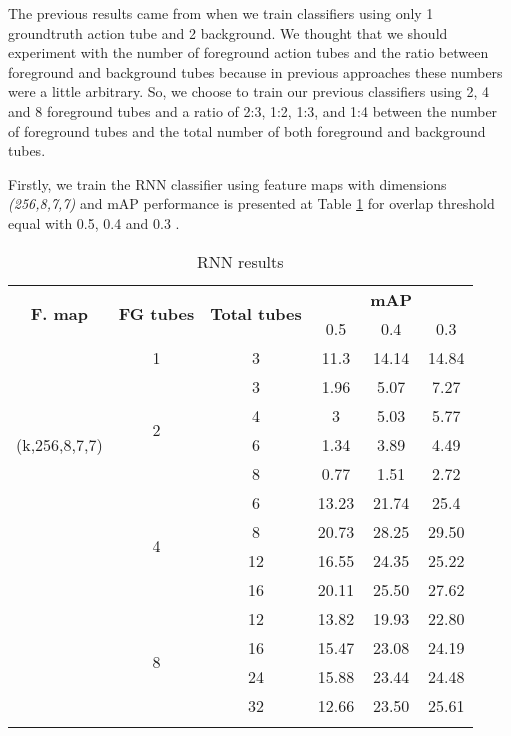 The previous results came from when we train classifiers using only 1 groundtruth action tube and 2 background. We thought that we should
experiment with the number of foreground action tubes and the ratio between foreground and background tubes because in previous approaches
these numbers were a little arbitrary. So, we choose to train our previous classifiers using 2, 4 and 8 foreground tubes and a ratio of 2:3,
1:2, 1:3, and 1:4 between the number of foreground tubes and the total number of both foreground and background tubes. \par

Firstly, we train the RNN classifier using feature maps with dimensions \textit{(256,8,7,7)} and mAP performance is presented at Table 
\ref{table:rnn_increased} for overlap threshold equal with 0.5, 0.4 and 0.3 . 

\begin{center}
  \begin{longtable}{|| c | c | c || c c c||}
    \hline
    \multirow{2}{*}{\textbf{F. map}} & \multirow{2}{*}{\textbf{FG tubes}}  & \multirow{2}{*}{\textbf{Total tubes}} & {} & \textbf{mAP} & {} \\
    {}  & {} & {} & 0.5 & 0.4 & 0.3 \\
    \hline
    \multirow{7}{*}{(k,256,8,7,7)} & 1 & 3 & 11.3 & 14.14 & 14.84 \\
    \cline{2-6}
    {} & \multirow{4}{*}{2} & 3 & 1.96 & 5.07 & 7.27 \\
    \cline{3-6}
    {} & {} & 4  & 3 & 5.03 & 5.77 \\
    \cline{3-6}
    {} & {} & 6 & 1.34 & 3.89 & 4.49 \\
    \cline{3-6}
    {} & {} & 8 & 0.77 & 1.51 & 2.72 \\
    \cline{2-6}
    {} & \multirow{4}{*}{4} &  6 & 13.23 & 21.74 & 25.4 \\
    \cline{3-6}
    {} & {} & 8 & 20.73 & 28.25 & 29.50 \\
    \cline{3-6}
    {} & {} & 12  & 16.55 & 24.35 & 25.22 \\
    \cline{3-6}
    {} & {} & 16  & 20.11 & 25.50 & 27.62 \\
    \cline{2-6}
    {} & \multirow{4}{*}{8} & 12 & 13.82 & 19.93 & 22.80 \\
    \cline{3-6}
    {} &  {} & 16 & 15.47 & 23.08 & 24.19 \\
    \cline{3-6}
    {} &  {} & 24 & 15.88 & 23.44 & 24.48  \\
    \cline{3-6}
    {} &  {} & 32 &  12.66 & 23.50 & 25.61 \\
    \hline

  \caption{RNN results }
  \label{table:rnn_increased}
\end{longtable}
\end{center}

